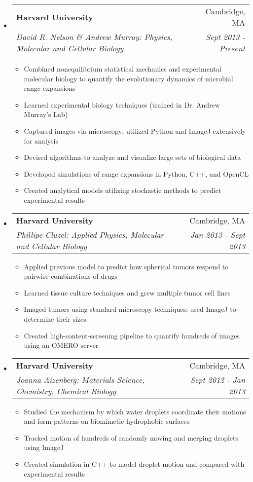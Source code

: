 \documentclass[letterpaper,11pt]{article}
\makeatletter
\newcommand{\resitem}[1]{\item #1 \vspace{-2pt}}
\newcommand{\ressubheading}[4]{\vspace{-14pt}
\begin{tabular*}{7.0in}{l@{\extracolsep{\fill}}r}
                \\
                \textbf{#1} & #2 \\
                \textit{#3} & \textit{#4} \\
\end{tabular*}\vspace{-6pt}}
\makeatother
\begin{document}
\begin{itemize}

\item
        \ressubheading{Harvard University}{Cambridge, MA}{David R. Nelson \& Andrew Murray: Physics, Molecular and Cellular Biology}{Sept 2013 - Present}
\begin{itemize}
        \resitem{Combined nonequilibrium statistical mechanics and experimental molecular biology to quantify the evolutionary dynamics of microbial range expansions}
        \resitem{Learned experimental biology techniques (trained in Dr. Andrew Murray's Lab)}
        \resitem{Captured images via microscopy; utilized Python and ImageJ extensively for analysis}
        \resitem{Devised algorithms to analyze and visualize large sets of biological data}
        \resitem{Developed simulations of range expansions in Python, C++, and OpenCL}
        \resitem{Created analytical models utilizing stochastic methods to predict experimental results}
\end{itemize}

\item
        \ressubheading{Harvard University}{Cambridge, MA}{Phillipe Cluzel: Applied Physics, Molecular and Cellular Biology }{Jan 2013 - Sept 2013}
\begin{itemize}
        \resitem{Applied previous model to predict how spherical tumors respond to pairwise combinations of drugs}
        \resitem{Learned tissue culture techniques and grew multiple tumor cell lines}
        \resitem{Imaged tumors using standard microscopy techniques; used ImageJ to determine their sizes}
        \resitem{Created high-content-screening pipeline to quantify hundreds of images using an OMERO server}
\end{itemize}

\item
        \ressubheading{Harvard University}{Cambridge, MA}{Joanna Aizenberg: Materials Science, Chemistry, Chemical Biology}{Sept 2012 - Jan 2013}
\begin{itemize}
        \resitem{Studied the mechanism by which water droplets coordinate their motions and form patterns on biomimetic hydrophobic surfaces}
        \resitem{Tracked motion of hundreds of randomly moving and merging droplets using ImageJ}
        \resitem{Created simulation in C++ to model droplet motion and compared with experimental results}
\end{itemize}

\end{itemize}
\end{document}
